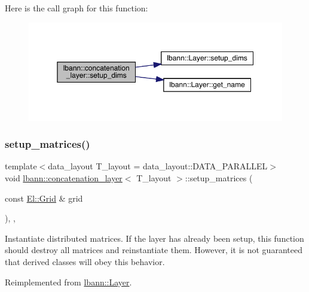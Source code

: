 Here is the call graph for this function\+:\nopagebreak
\begin{figure}[H]
\begin{center}
\leavevmode
\includegraphics[width=350pt]{classlbann_1_1concatenation__layer_abc44199934950480dbde30e0b7058a78_cgraph}
\end{center}
\end{figure}
\mbox{\label{classlbann_1_1concatenation__layer_a9c305ea0cbee1b7b6fe822f514c48d42}} 
\subsubsection{\texorpdfstring{setup\+\_\+matrices()}{setup\_matrices()}}
{\footnotesize\ttfamily template$<$data\+\_\+layout T\+\_\+layout = data\+\_\+layout\+::\+D\+A\+T\+A\+\_\+\+P\+A\+R\+A\+L\+L\+EL$>$ \\
void \hyperlink{classlbann_1_1concatenation__layer}{lbann\+::concatenation\+\_\+layer}$<$ T\+\_\+layout $>$\+::setup\+\_\+matrices (\begin{DoxyParamCaption}\item[{const \hyperlink{base_8hpp_a9951bb1719d534e0401b1f06cad19eab}{El\+::\+Grid} \&}]{grid }\end{DoxyParamCaption})\hspace{0.3cm}{\ttfamily [inline]}, {\ttfamily [override]}, {\ttfamily [virtual]}}

Instantiate distributed matrices. If the layer has already been setup, this function should destroy all matrices and reinstantiate them. However, it is not guaranteed that derived classes will obey this behavior. 

Reimplemented from \hyperlink{classlbann_1_1Layer_a57bbe21131dc00ab5cf9ea5e3656808e}{lbann\+::\+Layer}.




